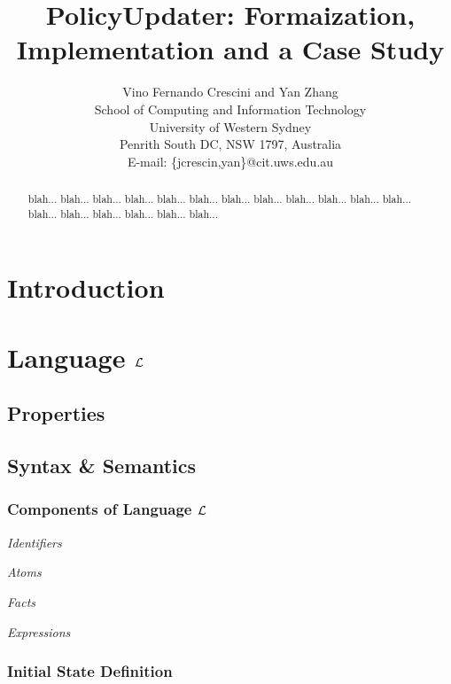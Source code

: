 \documentclass[10pt, twocolumn]{article}
\begin{document}
  \title{PolicyUpdater: Formaization, Implementation and a Case Study}
  \author{Vino Fernando Crescini and Yan Zhang \\
          School of Computing and Information Technology \\
          University of Western Sydney \\
          Penrith South DC, NSW 1797, Australia \\
          E-mail: \{jcrescin,yan\}@cit.uws.edu.au}

  \date{}

  \maketitle

  \begin{abstract}
    blah... blah... blah... blah... blah... blah... blah... blah... blah... 
    blah... blah... blah... blah... blah... blah... blah... blah... blah... 
  \end{abstract}

  \section{Introduction}

  \section{Language $\cal{L}$}

    \subsection{Properties}

    \subsection{Syntax \& Semantics}

      \subsubsection{Components of Language $\cal{L}$}

        \noindent \emph{Identifiers}

        \noindent \emph{Atoms}

        \noindent \emph{Facts}

        \noindent \emph{Expressions}

      \subsubsection{Initial State Definition}
\end{document}
